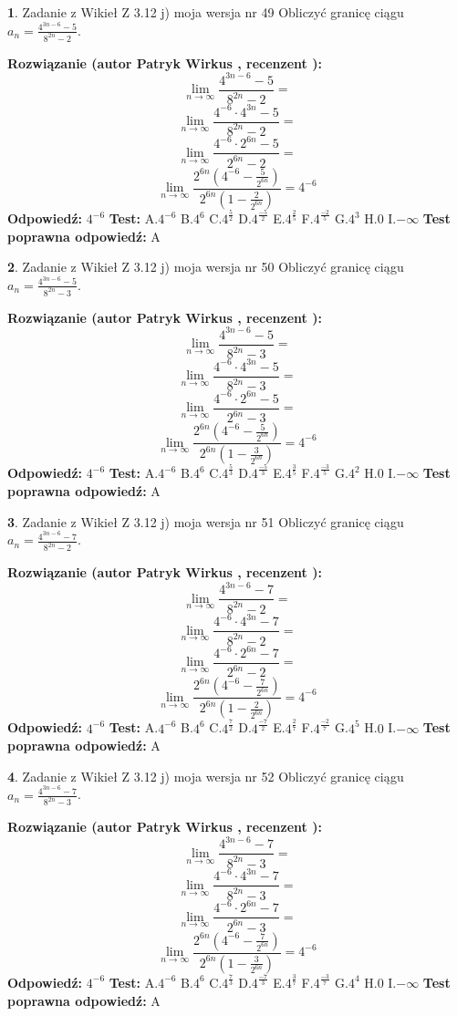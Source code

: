 \documentclass[12pt, a4paper]{article}
\theoremstyle{definition} %
\newtheorem{zad}{}
\newcommand{\zadStart}[1]{\begin{zad}#1\newline}
\newcommand{\zadStop}{\end{zad}}
\newcommand{\rozwStart}[2]{\noindent \textbf{Rozwiązanie (autor #1 , recenzent #2): }\newline}
\newcommand{\rozwStop}{\newline}
\newcommand{\odpStart}{\noindent \textbf{Odpowiedź:}\newline}
\newcommand{\odpStop}{\newline}
\newcommand{\testStart}{\noindent \textbf{Test:}\newline}
\newcommand{\testStop}{\newline}
\newcommand{\kluczStart}{\noindent \textbf{Test poprawna odpowiedź:}\newline}
\newcommand{\kluczStop}{\newline}
\begin{document}
\zadStart{Zadanie z Wikieł Z 3.12 j) moja wersja nr 49}
Obliczyć granicę ciągu $a_{n}=\frac{4^{3n-6}-5}{8^{2n}-2}$.
\zadStop
\rozwStart{Patryk Wirkus}{}
$$\lim\limits_{n\to\infty}\frac{4^{3n-6}-5}{8^{2n}-2}=$$
$$\lim\limits_{n\to\infty}\frac{4^{-6} \cdot 4^{3n}-5}{8^{2n}-2}=$$
$$\lim\limits_{n\to\infty}\frac{4^{-6} \cdot 2^{6n}-5}{2^{6n}-2}=$$
$$\lim\limits_{n\to\infty}\frac{2^{6n}(4^{-6} - \frac{5}{2^{6n}})}{2^{6n}(1-\frac{2}{2^{6n}})}= 4^{-6}$$
\rozwStop
\odpStart
$4^{-6}$
\odpStop
\testStart
A.$4^{-6}$
B.$4^{6}$
C.$4^{\frac{5}{2}}$
D.$4^{\frac{-5}{2}}$
E.$4^{\frac{2}{5}}$
F.$4^{\frac{-2}{5}}$
G.$4^{3}$
H.$0$
I.$-\infty$
\testStop
\kluczStart
A
\kluczStop



\zadStart{Zadanie z Wikieł Z 3.12 j) moja wersja nr 50}
Obliczyć granicę ciągu $a_{n}=\frac{4^{3n-6}-5}{8^{2n}-3}$.
\zadStop
\rozwStart{Patryk Wirkus}{}
$$\lim\limits_{n\to\infty}\frac{4^{3n-6}-5}{8^{2n}-3}=$$
$$\lim\limits_{n\to\infty}\frac{4^{-6} \cdot 4^{3n}-5}{8^{2n}-3}=$$
$$\lim\limits_{n\to\infty}\frac{4^{-6} \cdot 2^{6n}-5}{2^{6n}-3}=$$
$$\lim\limits_{n\to\infty}\frac{2^{6n}(4^{-6} - \frac{5}{2^{6n}})}{2^{6n}(1-\frac{3}{2^{6n}})}= 4^{-6}$$
\rozwStop
\odpStart
$4^{-6}$
\odpStop
\testStart
A.$4^{-6}$
B.$4^{6}$
C.$4^{\frac{5}{3}}$
D.$4^{\frac{-5}{3}}$
E.$4^{\frac{3}{5}}$
F.$4^{\frac{-3}{5}}$
G.$4^{2}$
H.$0$
I.$-\infty$
\testStop
\kluczStart
A
\kluczStop



\zadStart{Zadanie z Wikieł Z 3.12 j) moja wersja nr 51}
Obliczyć granicę ciągu $a_{n}=\frac{4^{3n-6}-7}{8^{2n}-2}$.
\zadStop
\rozwStart{Patryk Wirkus}{}
$$\lim\limits_{n\to\infty}\frac{4^{3n-6}-7}{8^{2n}-2}=$$
$$\lim\limits_{n\to\infty}\frac{4^{-6} \cdot 4^{3n}-7}{8^{2n}-2}=$$
$$\lim\limits_{n\to\infty}\frac{4^{-6} \cdot 2^{6n}-7}{2^{6n}-2}=$$
$$\lim\limits_{n\to\infty}\frac{2^{6n}(4^{-6} - \frac{7}{2^{6n}})}{2^{6n}(1-\frac{2}{2^{6n}})}= 4^{-6}$$
\rozwStop
\odpStart
$4^{-6}$
\odpStop
\testStart
A.$4^{-6}$
B.$4^{6}$
C.$4^{\frac{7}{2}}$
D.$4^{\frac{-7}{2}}$
E.$4^{\frac{2}{7}}$
F.$4^{\frac{-2}{7}}$
G.$4^{5}$
H.$0$
I.$-\infty$
\testStop
\kluczStart
A
\kluczStop



\zadStart{Zadanie z Wikieł Z 3.12 j) moja wersja nr 52}
Obliczyć granicę ciągu $a_{n}=\frac{4^{3n-6}-7}{8^{2n}-3}$.
\zadStop
\rozwStart{Patryk Wirkus}{}
$$\lim\limits_{n\to\infty}\frac{4^{3n-6}-7}{8^{2n}-3}=$$
$$\lim\limits_{n\to\infty}\frac{4^{-6} \cdot 4^{3n}-7}{8^{2n}-3}=$$
$$\lim\limits_{n\to\infty}\frac{4^{-6} \cdot 2^{6n}-7}{2^{6n}-3}=$$
$$\lim\limits_{n\to\infty}\frac{2^{6n}(4^{-6} - \frac{7}{2^{6n}})}{2^{6n}(1-\frac{3}{2^{6n}})}= 4^{-6}$$
\rozwStop
\odpStart
$4^{-6}$
\odpStop
\testStart
A.$4^{-6}$
B.$4^{6}$
C.$4^{\frac{7}{3}}$
D.$4^{\frac{-7}{3}}$
E.$4^{\frac{3}{7}}$
F.$4^{\frac{-3}{7}}$
G.$4^{4}$
H.$0$
I.$-\infty$
\testStop
\kluczStart
A
\kluczStop
\end{document}
